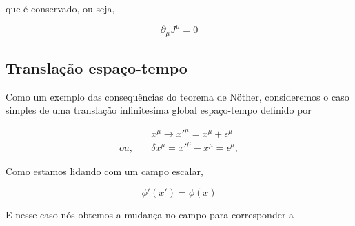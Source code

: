 que é conservado, ou seja,

\begin{equation}
\partial_\mu J^\mu = 0
\end{equation}

\subsection{Translação espaço-tempo}

Como um exemplo das consequências do teorema de Nöther, consideremos o caso simples de uma translação infinitesima global espaço-tempo definido por

\begin{equation}
\begin{aligned}
&x^\mu \rightarrow x'^\mu = x^\mu + \epsilon^\mu \\
ou, \quad &\delta x^\mu = x'^\mu -x^\mu = \epsilon ^\mu , \label{eq:spacetimetranslation}
\end{aligned}
\end{equation}

Como estamos lidando com um campo escalar, 

\begin{equation}
\phi'(x') = \phi(x)
\end{equation}

E nesse caso nós obtemos a mudança no campo para corresponder a


